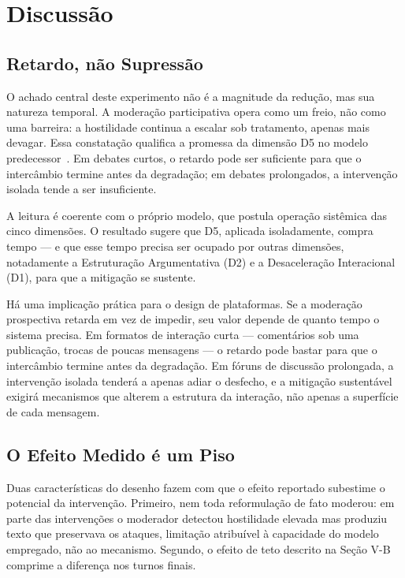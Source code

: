 \documentclass[conference]{IEEEtran} \IEEEoverridecommandlockouts %
\begin{document}
\section{Discussão}

\subsection{Retardo, não Supressão}

O achado central deste experimento não é a magnitude da redução, mas sua
natureza temporal. A moderação participativa opera como um freio, não como uma
barreira: a hostilidade continua a escalar sob tratamento, apenas mais devagar.
Essa constatação qualifica a promessa da dimensão D5 no modelo
predecessor~\cite{moura2026hostility}. Em debates curtos, o retardo pode ser
suficiente para que o intercâmbio termine antes da degradação; em debates
prolongados, a intervenção isolada tende a ser insuficiente.

A leitura é coerente com o próprio modelo, que postula operação sistêmica das
cinco dimensões. O resultado sugere que D5, aplicada isoladamente, compra tempo
— e que esse tempo precisa ser ocupado por outras dimensões, notadamente a
Estruturação Argumentativa (D2) e a Desaceleração Interacional (D1), para que a
mitigação se sustente.

Há uma implicação prática para o design de plataformas. Se a moderação
prospectiva retarda em vez de impedir, seu valor depende de quanto tempo o
sistema precisa. Em formatos de interação curta — comentários sob uma
publicação, trocas de poucas mensagens — o retardo pode bastar para que o
intercâmbio termine antes da degradação. Em fóruns de discussão prolongada, a
intervenção isolada tenderá a apenas adiar o desfecho, e a mitigação
sustentável exigirá mecanismos que alterem a estrutura da interação, não apenas
a superfície de cada mensagem.

\subsection{O Efeito Medido é um Piso}

Duas características do desenho fazem com que o efeito reportado subestime o
potencial da intervenção. Primeiro, nem toda reformulação de fato moderou: em
parte das intervenções o moderador detectou hostilidade elevada mas produziu
texto que preservava os ataques, limitação atribuível à capacidade do modelo
empregado, não ao mecanismo. Segundo, o efeito de teto descrito na Seção V-B
comprime a diferença nos turnos finais.
\end{document}

